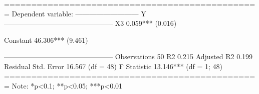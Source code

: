 
===============================================
                        Dependent variable:    
                    ---------------------------
                                 Y             
-----------------------------------------------
X3                           0.059***          
                              (0.016)          
                                               
Constant                     46.306***         
                              (9.461)          
                                               
-----------------------------------------------
Observations                    50             
R2                             0.215           
Adjusted R2                    0.199           
Residual Std. Error      16.567 (df = 48)      
F Statistic           13.146*** (df = 1; 48)   
===============================================
Note:               *p<0.1; **p<0.05; ***p<0.01
